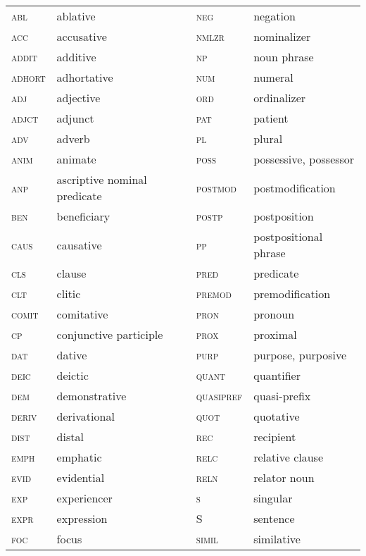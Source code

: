  \begin{table}[h]
 	\centering
 		\begin{tabular}{ll|ll}
 \textsc{abl} 	& ablative & \textsc{neg} 	& negation \\
 \textsc{acc} 	& accusative & \textsc{nmlzr} 	& nominalizer \\
 \textsc{addit} 	& additive & \textsc{np} 	& noun phrase \\
 \textsc{adhort} & adhortative & \textsc{num} 	& numeral \\
 \textsc{adj} 	& adjective & \textsc{ord} 	& ordinalizer \\
 \textsc{adjct} 	& adjunct & \textsc{pat} 	& patient \\
 \textsc{adv} 	& adverb & \textsc{pl} 	& plural \\
 \textsc{anim} 	& animate & \textsc{poss} 	& possessive, possessor \\
 \textsc{anp} 		& ascriptive nominal predicate & \textsc{postmod} & postmodification \\
 \textsc{ben} 	& beneficiary & \textsc{postp} 	& postposition \\
 \textsc{caus} 	& causative & \textsc{pp} 	& postpositional phrase \\
 \textsc{cls} 	& clause & \textsc{pred} 	& predicate \\
 \textsc{clt} 	& clitic & \textsc{premod} 	& premodification \\
 \textsc{comit} 	& comitative & \textsc{pron} 	& pronoun \\
 \textsc{cp} 	& conjunctive participle & \textsc{prox} 	& proximal \\
 \textsc{dat} 	& dative & \textsc{purp} 	& purpose, purposive \\
 \textsc{deic} 	& deictic & \textsc{quant} 	& quantifier \\
 \textsc{dem} 	& demonstrative & \textsc{quasipref}& quasi-prefix \\
 \textsc{deriv} 	& derivational & \textsc{quot} 	& quotative \\
 \textsc{dist} 	& distal & \textsc{rec} 	& recipient \\
 \textsc{emph} 	& emphatic & \textsc{relc} 	& relative clause \\
 \textsc{evid} 	& evidential & \textsc{reln} 	& relator noun \\
 \textsc{exp} 	& experiencer & \textsc{s} 	& singular \\
 \textsc{expr} 	& expression & S 	& sentence \\
 \textsc{foc} 	& focus & \textsc{simil} 	& similative \\

\end{tabular}
\end{table}
